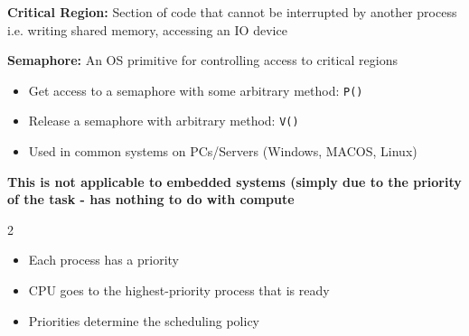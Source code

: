 \documentclass[a4paper,11pt]{article}
\newcommand{\code}[1]{\texttt{#1}}
\begin{document}



\textbf{Critical Region:} Section of code that cannot be interrupted by another process i.e. writing shared memory, accessing an IO device\par

\textbf{Semaphore:} An OS primitive for controlling access to critical regions\par

\Needspace{40pt}
\begin{itemize}
\item Get access to a semaphore with some arbitrary method: \code{P()}
\item Release a semaphore with arbitrary method: \code{V()}
\end{itemize}


\Needspace{125pt}



\Needspace{28pt}
\begin{itemize}
\item Used in common systems on PCs/Servers (Windows, MACOS, Linux)
\end{itemize}



\textbf{This is not applicable to embedded systems (simply due to the priority of the task - has nothing to do with compute}\par



\Needspace{125pt}



\Needspace{52pt}
\begin{multicols}{2}
\begin{itemize}
\item \begin{minipage}[t]{\linewidth}Each process has a priority\end{minipage}
\item \begin{minipage}[t]{\linewidth}CPU goes to the highest-priority process that is ready\end{minipage}
\item \begin{minipage}[t]{\linewidth}Priorities determine the scheduling policy\end{minipage}
\end{itemize}
\end{multicols}
\end{document}
